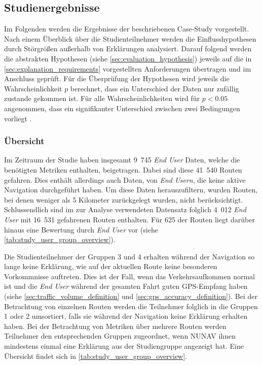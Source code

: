 \subsection{Studienergebnisse}
\label{sec:study_results_quantitativ}

Im Folgenden werden die Ergebnisse der beschriebenen Case-Study vorgestellt. Nach einem Überblick über die Studienteilnehmer werden die Einflusshypothesen durch Störgrößen außerhalb von Erklärungen analysiert. Darauf folgend werden die abstrakten Hypothesen (siehe \autoref{sec:evaluation_hypothesis}) jeweils auf die in \autoref{sec:explanation_requirements} vorgestellten Anforderungen übertragen und im Anschluss geprüft. Für die Überprüfung der Hypothesen wird jeweils die Wahrscheinlichkeit $ p $ berechnet, dass ein Unterschied der Daten nur zufällig zustande gekommen ist. Für alle Wahrscheinlichkeiten wird für $ p < 0.05 $ angenommen, dass ein signifikanter Unterschied zwischen zwei Bedingungen vorliegt \cite[vgl.][]{wohlin2012experimentation}.

\subsubsection{Übersicht}

Im Zeitraum der Studie haben insgesamt 9~745 \textit{End User} Daten, welche die benötigten Metriken enthalten, beigetragen. Dabei sind diese 41~540 Routen gefahren. Dies enthält allerdings auch Daten, von \textit{End Usern}, die keine aktive Navigation durchgeführt haben. Um diese Daten herauszufiltern, wurden Routen, bei denen weniger als 5 Kilometer zurückgelegt wurden, nicht berücksichtigt. Schlussendlich sind im zur Analyse verwendeten Datensatz folglich 4~012 \textit{End User} mit 16~531 gefahrenen Routen enthalten. Für 625 der Routen liegt darüber hinaus eine Bewertung durch \textit{End User} vor (siehe \autoref{tab:study_user_group_overview}).

Die Studienteilnehmer der Gruppen 3 und 4 erhalten während der Navigation so lange keine Erklärung, wie auf der aktuellen Route keine besonderen Vorkommnisse auftreten. Dies ist der Fall, wenn das Verkehrsaufkommen \glqq normal\grqq{} ist und die \textit{End User} während der gesamten Fahrt guten GPS-Empfang haben (siehe \autoref{sec:traffic_volume_definition} und \autoref{sec:gps_accuracy_definition}). Bei der Betrachtung von einzelnen Routen werden die Teilnehmer folglich in die Gruppen 1 oder 2 umsortiert, falls sie während der Navigation keine Erklärung erhalten haben. Bei der Betrachtung von Metriken über mehrere Routen werden Teilnehmer den entsprechenden Gruppen zugeordnet, wenn NUNAV ihnen mindestens einmal eine Erklärung aus der Studiengruppe angezeigt hat. Eine Übersicht findet sich in \autoref{tab:study_user_group_overview}.

